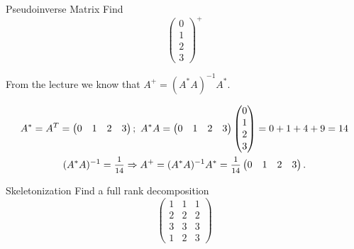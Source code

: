 \documentclass[12pt]{report}
\begin{document}
\boldmath
{}

\setcounter{section}{1}

\begin{problem}{Pseudoinverse Matrix}
    Find 
    \[
    \begin{pmatrix}
      0\\
      1\\
      2\\
      3
    \end{pmatrix}^{+}
    \]
    \end{problem}
    
    \begin{solution}
    From the lecture we know that $A^{+} = (A^{*}A)^{-1}A^{*}$.
    
    \begin{gather*} 
        A^{*} = A^T = 
    \begin{pmatrix}
      0 & 1 & 2 & 3
    \end{pmatrix}
    ;\ A^{*}A = 
    \begin{pmatrix}
      0 & 1 & 2 & 3
    \end{pmatrix}
    \begin{pmatrix}
      0\\
      1\\
      2\\
      3
    \end{pmatrix}
     = 0 + 1 + 4 + 9 = 14\\ (A^{*}A)^{-1} = \medmath{\frac{1}{14}} \Rightarrow A^{+} = (A^{*}A)^{-1}A^{*} = \medmath{\frac{1}{14}}
     \begin{pmatrix}
      0 & 1 & 2 & 3
    \end{pmatrix}. \end{gather*}
    \end{solution}
    
    \vspace{\baselineskip}
    
    \begin{problem}{Skeletonization}
        Find a full rank decomposition
        \[
    \begin{pmatrix}
        1 & 1 & 1\\
        2 & 2 & 2\\
        3 & 3 & 3\\
        1 & 2 & 3
    \end{pmatrix}
        \]
    \end{problem}
    
\end{document}
